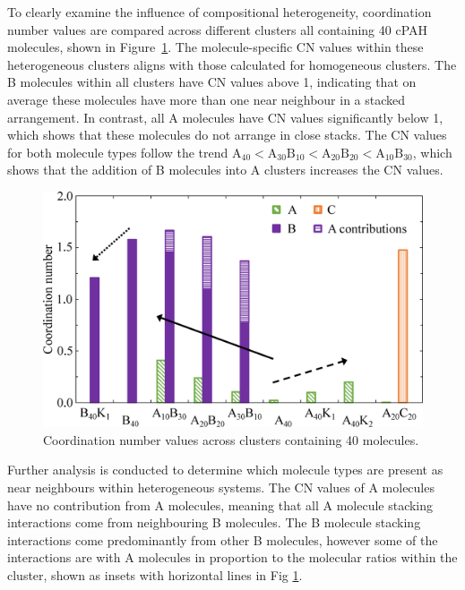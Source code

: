 To clearly examine the influence of compositional heterogeneity, coordination number values are compared across different clusters all containing 40 cPAH molecules, shown in Figure~\ref{fig:coordination_numbers}. The molecule-specific CN values within these heterogeneous clusters aligns with those calculated for homogeneous clusters. The B molecules within all clusters have CN values above 1, indicating that on average these molecules have more than one near neighbour in a stacked arrangement. In contrast, all A molecules have CN values significantly below 1, which shows that these molecules do not arrange in close stacks.  
The CN values for both molecule types follow the trend $\text{A}_{\text{40}} < \text{A}_{\text{30}}\text{B}_{\text{10}} < \text{A}_{\text{20}}\text{B}_{\text{20}} < \text{A}_{\text{10}}\text{B}_{\text{30}}$, which shows that the addition of B molecules into A clusters increases the CN values.
%
\begin{figure}[!bth]
\centering
\includegraphics[width=0.8\linewidth]{Figures/CN_bar_chart_updated.eps}
\caption{Coordination number values across clusters containing 40 molecules.}
\label{fig:coordination_numbers}
\end{figure}
%

Further analysis is conducted to determine which molecule types are present as near neighbours within heterogeneous systems. The CN values of A molecules have no contribution from A molecules, meaning that all A molecule stacking interactions come from neighbouring B molecules. The B molecule stacking interactions come predominantly from other B molecules, however some of the interactions are with A molecules in proportion to the molecular ratios within the cluster, shown as insets with horizontal lines in Fig \ref{fig:coordination_numbers}.
%

